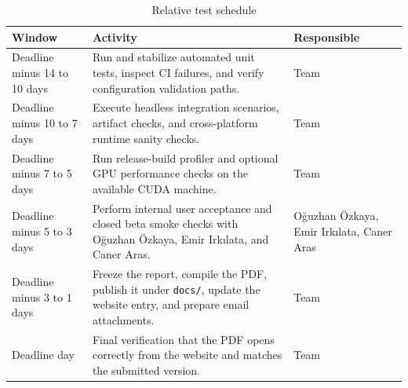 \begin{table}[H]
	\centering
	\caption{Relative test schedule}
	\label{tab:test-schedule}
	\begin{tabularx}{\textwidth}{@{}>{\ttfamily\small}lX>{\RaggedRight\arraybackslash}p{4.0cm}@{}}
		\toprule
		\textbf{Window}              & \textbf{Activity}                                                                                                             & \textbf{Responsible}                      \\
		\midrule
		Deadline minus 14 to 10 days & Run and stabilize automated unit tests, inspect CI failures, and verify configuration validation paths.                       & Team                                      \\
		Deadline minus 10 to 7 days  & Execute headless integration scenarios, artifact checks, and cross-platform runtime sanity checks.                            & Team                                      \\
		Deadline minus 7 to 5 days   & Run release-build profiler and optional GPU performance checks on the available CUDA machine.                                 & Team                                      \\
		Deadline minus 5 to 3 days   & Perform internal user acceptance and closed beta smoke checks with Oğuzhan Özkaya, Emir Irkılata, and Caner Aras.             & Oğuzhan Özkaya, Emir Irkılata, Caner Aras \\
		Deadline minus 3 to 1 days   & Freeze the report, compile the PDF, publish it under \texttt{docs/}, update the website entry, and prepare email attachments. & Team                                      \\
		Deadline day                 & Final verification that the PDF opens correctly from the website and matches the submitted version.                           & Team                                      \\
		\bottomrule
	\end{tabularx}
\end{table}
